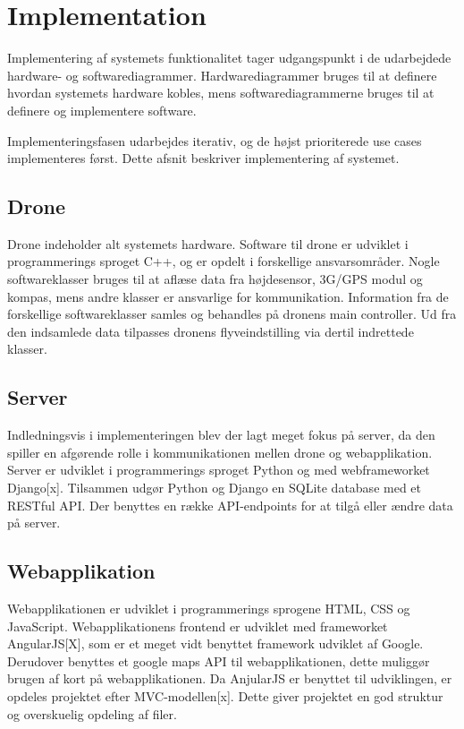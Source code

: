 \section{Implementation}
Implementering af systemets funktionalitet tager udgangspunkt i de udarbejdede hardware- og softwarediagrammer. Hardwarediagrammer bruges til at definere hvordan systemets hardware kobles, mens softwarediagrammerne bruges til at definere og implementere software.

Implementeringsfasen udarbejdes iterativ, og de højst prioriterede use cases implementeres først. 
Dette afsnit beskriver implementering af systemet.


\subsection{Drone}
Drone indeholder alt systemets hardware. Software til drone er udviklet i programmerings sproget C++, og er opdelt i forskellige ansvarsområder. Nogle softwareklasser bruges til at aflæse data fra højdesensor, 3G/GPS modul og kompas, mens andre klasser er ansvarlige for kommunikation. Information fra de forskellige softwareklasser samles og behandles på dronens main controller. Ud fra den indsamlede data tilpasses dronens flyveindstilling via dertil indrettede klasser. 


\subsection{Server}
Indledningsvis i implementeringen blev der lagt meget fokus på server, da den spiller en afgørende rolle i kommunikationen mellen drone og webapplikation. 
Server er udviklet i programmerings sproget Python og med webframeworket Django[x].
Tilsammen udgør Python og Django en SQLite database med et RESTful API. Der benyttes en række API-endpoints for at tilgå eller ændre data på server.

\subsection{Webapplikation}
Webapplikationen  er udviklet i programmerings sprogene HTML, CSS og JavaScript. Webapplikationens frontend er udviklet med frameworket AngularJS[X], som er et meget vidt benyttet framework udviklet af Google. Derudover benyttes et google maps API til webapplikationen, dette muliggør brugen af kort på webapplikationen. Da AnjularJS er benyttet til udviklingen, er opdeles projektet efter MVC-modellen[x]. Dette giver projektet en god struktur og overskuelig opdeling af filer.